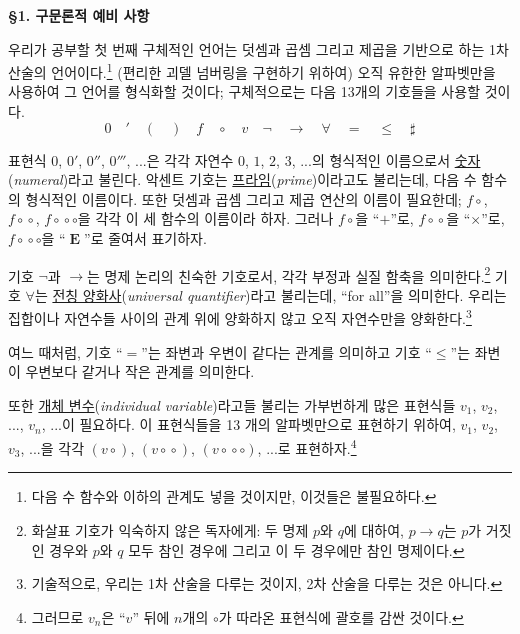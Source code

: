 \documentclass[12pt]{paper}
\begin{document}
  \noindent \textbf{\S1. 구문론적 예비 사항}

  우리가 공부할 첫 번째 구체적인 언어는 덧셈과 곱셈 그리고 제곱을 기반으로 하는 1차 산술의 언어이다.\footnote
  {
    다음 수 함수와 이하의 관계도 넣을 것이지만, 이것들은 불필요하다.
  }
  (편리한 괴델 넘버링을 구현하기 위하여) 오직 유한한 알파벳만을 사용하여 그 언어를 형식화할 것이다;
  구체적으로는 다음 13개의 기호들을 사용할 것이다.
  $$ 0 \quad ' \quad \left( \quad \right) \quad f \quad \circ \quad v \quad \lnot \quad \rightarrow \quad \forall \quad = \quad \le \quad \sharp $$

  표현식 $0$, $0'$, $0''$, $0'''$, ...은
  각각 자연수 $0$, $1$, $2$, $3$, ...의 형식적인 이름으로서 \underline{숫자}(\textit{numeral})라고 불린다.
  악센트 기호는 \underline{프라임}(\textit{prime})이라고도 불리는데,
  다음 수 함수의 형식적인 이름이다.
  또한 덧셈과 곱셈 그리고 제곱 연산의 이름이 필요한데;
  $f \circ$, $f \! \circ \! \circ$, $f \! \circ \! \circ \circ$을 각각 이 세 함수의 이름이라 하자.
  그러나 $f \circ$을 ``$+$''로, $f \! \circ \! \circ$을 ``$\times$''로, $f \! \circ \! \circ \circ$을 ``$\mathop{\mathbf{E}}$''로 줄여서 표기하자.

  기호 $\lnot$과 $\rightarrow$는 명제 논리의 친숙한 기호로서,
  각각 부정과 실질 함축을 의미한다.\footnote
  {
    화살표 기호가 익숙하지 않은 독자에게: 두 명제 $p$와 $q$에 대하여, $p \rightarrow q$는 $p$가 거짓인 경우와 $p$와 $q$ 모두 참인 경우에 그리고 이 두 경우에만 참인 명제이다.
  }
  기호 $\forall$는 \underline{전칭 양화사}(\textit{universal quantifier})라고 불리는데, ``for all''을 의미한다.
  우리는 집합이나 자연수들 사이의 관계 위에 양화하지 않고 오직 자연수만을 양화한다.\footnote
  {
    기술적으로, 우리는 1차 산술을 다루는 것이지, 2차 산술을 다루는 것은 아니다.
  }

  여느 때처럼, 기호 ``$=$''는 좌변과 우변이 같다는 관계를 의미하고 기호 ``$\leq$''는 좌변이 우변보다 같거나 작은 관계를 의미한다.

  또한 \underline{개체 변수}(\textit{individual variable})라고들 불리는 가부번하게 많은 표현식들 $v_{1}$, $v_{2}$, ..., $v_{n}$, ...이 필요하다.
  이 표현식들을 13 개의 알파벳만으로 표현하기 위하여, $v_{1}$, $v_{2}$, $v_{3}$, ...을 각각 $\left( v \circ \right)$, $\left( v \! \circ \! \circ \right)$, $\left( v \! \circ \! \circ \circ \right)$, ...로 표현하자.\footnote
  {
    그러므로 $v_{n}$은 ``$v$'' 뒤에 $n$개의 $\circ$가 따라온 표현식에 괄호를 감싼 것이다.
  }
\end{document}
